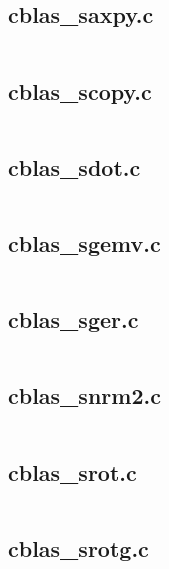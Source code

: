 \documentclass{article}
\begin{document}
\subsection{cblas\_saxpy.c}
\inputminted{c}{/home/dufferzafar/dev/@clones/scikit-learn/sklearn/src/cblas/cblas_saxpy.c}
\newpage

\subsection{cblas\_scopy.c}
\inputminted{c}{/home/dufferzafar/dev/@clones/scikit-learn/sklearn/src/cblas/cblas_scopy.c}
\newpage

\subsection{cblas\_sdot.c}
\inputminted{c}{/home/dufferzafar/dev/@clones/scikit-learn/sklearn/src/cblas/cblas_sdot.c}
\newpage

\subsection{cblas\_sgemv.c}
\inputminted{c}{/home/dufferzafar/dev/@clones/scikit-learn/sklearn/src/cblas/cblas_sgemv.c}
\newpage

\subsection{cblas\_sger.c}
\inputminted{c}{/home/dufferzafar/dev/@clones/scikit-learn/sklearn/src/cblas/cblas_sger.c}
\newpage

\subsection{cblas\_snrm2.c}
\inputminted{c}{/home/dufferzafar/dev/@clones/scikit-learn/sklearn/src/cblas/cblas_snrm2.c}
\newpage

\subsection{cblas\_srot.c}
\inputminted{c}{/home/dufferzafar/dev/@clones/scikit-learn/sklearn/src/cblas/cblas_srot.c}
\newpage

\subsection{cblas\_srotg.c}
\inputminted{c}{/home/dufferzafar/dev/@clones/scikit-learn/sklearn/src/cblas/cblas_srotg.c}
\newpage
\end{document}
